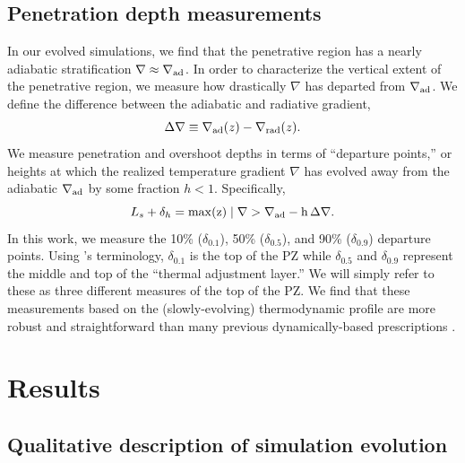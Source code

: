 \documentclass{aastex631}
\newcommand{\gradrad}{\ensuremath{\nabla_{\rm{rad}}}}
\newcommand{\gradad}{\ensuremath{\nabla_{\rm{ad}}}}
\newcommand{\justgrad}{\ensuremath{\nabla}}
\begin{document}
\subsection{Penetration depth measurements}
In our evolved simulations, we find that the penetrative region has a nearly adiabatic stratification $\justgrad \approx \gradad$.
In order to characterize the vertical extent of the penetrative region, we measure how drastically $\justgrad$ has departed from $\gradad$.
We define the difference between the adiabatic and radiative gradient,
\begin{equation}
\Delta\justgrad \equiv \gradad(z) - \gradrad(z).
\end{equation}
We measure penetration and overshoot depths in terms of ``departure points,'' or heights at which the realized temperature gradient $\justgrad$ has evolved away from the adiabatic $\gradad$ by some fraction $h < 1$.
Specifically,
\begin{equation}
L_s + \delta_{h} = \rm{max}(z) \mid \justgrad > \gradad - h\,\Delta\justgrad.
\end{equation}
In this work, we measure the 10\% ($\delta_{0.1}$), 50\% ($\delta_{0.5}$), and 90\% ($\delta_{0.9}$) departure points.
Using \citet{zahn1991}'s terminology, $\delta_{0.1}$ is the top of the PZ while $\delta_{0.5}$ and $\delta_{0.9}$ represent the middle and top of the ``thermal adjustment layer.''
We will simply refer to these as three different measures of the top of the PZ.
We find that these measurements based on the (slowly-evolving) thermodynamic profile are more robust and straightforward than many previous dynamically-based prescriptions \citep[see e.g.,][for a nice discussion]{pratt_etal_2017}.

\section{Results}
\label{sec:results}

\subsection{Qualitative description of simulation evolution}
\end{document}
